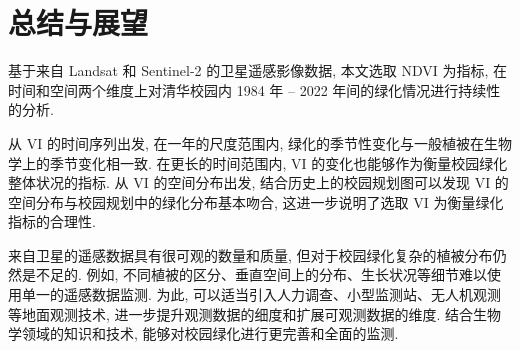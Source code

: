 
\section{总结与展望}

基于来自 Landsat 和 Sentinel-2 的卫星遥感影像数据, 本文选取 NDVI 为指标, 在时间和空间两个维度上对清华校园内 1984 年 -- 2022 年间的绿化情况进行持续性的分析.

从 VI 的时间序列出发, 在一年的尺度范围内, 绿化的季节性变化与一般植被在生物学上的季节变化相一致.
在更长的时间范围内, VI 的变化也能够作为衡量校园绿化整体状况的指标.
从 VI 的空间分布出发, 结合历史上的校园规划图可以发现 VI 的空间分布与校园规划中的绿化分布基本吻合, 这进一步说明了选取 VI 为衡量绿化指标的合理性.

来自卫星的遥感数据具有很可观的数量和质量, 但对于校园绿化复杂的植被分布仍然是不足的.
例如, 不同植被的区分、垂直空间上的分布、生长状况等细节难以使用单一的遥感数据监测.
为此, 可以适当引入人力调查、小型监测站、无人机观测等地面观测技术, 进一步提升观测数据的细度和扩展可观测数据的维度.
结合生物学领域的知识和技术, 能够对校园绿化进行更完善和全面的监测.
